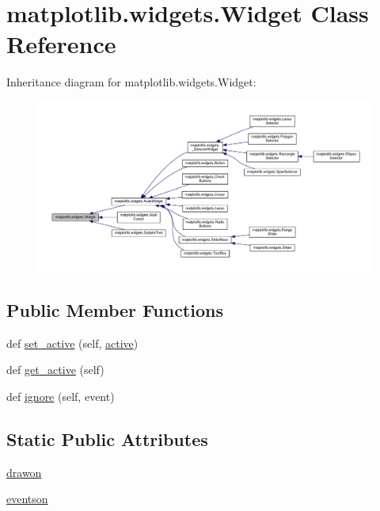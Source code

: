 \hypertarget{classmatplotlib_1_1widgets_1_1Widget}{}\section{matplotlib.\+widgets.\+Widget Class Reference}
\label{classmatplotlib_1_1widgets_1_1Widget}


Inheritance diagram for matplotlib.\+widgets.\+Widget\+:
\nopagebreak
\begin{figure}[H]
\begin{center}
\leavevmode
\includegraphics[width=350pt]{classmatplotlib_1_1widgets_1_1Widget__inherit__graph}
\end{center}
\end{figure}
\subsection*{Public Member Functions}
\begin{DoxyCompactItemize}
\item 
def \hyperlink{classmatplotlib_1_1widgets_1_1Widget_a77e00e53e44f4b872499004051120f71}{set\+\_\+active} (self, \hyperlink{classmatplotlib_1_1widgets_1_1Widget_a6fc79b9a86770ee3a3b46ea419b7ad74}{active})
\item 
def \hyperlink{classmatplotlib_1_1widgets_1_1Widget_a60f17f8bf5a5a5456e8956ff45d41051}{get\+\_\+active} (self)
\item 
def \hyperlink{classmatplotlib_1_1widgets_1_1Widget_a40f3557b670ca16e5102494417c85be1}{ignore} (self, event)
\end{DoxyCompactItemize}
\subsection*{Static Public Attributes}
\begin{DoxyCompactItemize}
\item 
\hyperlink{classmatplotlib_1_1widgets_1_1Widget_a5911ae5f43e3cdf8cdc369c0ec25b5dc}{drawon}
\item 
\hyperlink{classmatplotlib_1_1widgets_1_1Widget_a86482bd0cd2f83ad1bf4337d837a7057}{eventson}
\end{DoxyCompactItemize}
